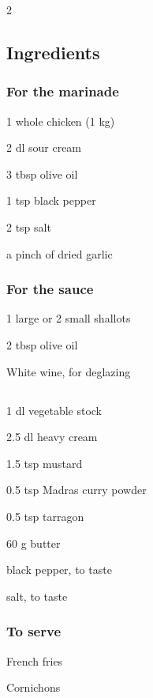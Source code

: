 \newpage
{}

\begin{multicols}{2}
	\subsection*{Ingredients}
	
	\subsubsection*{For the marinade}
	\begin{ingredients}
		\item 1 whole chicken (1 kg)
		\item 2 dl sour cream
		\item 3 tbsp olive oil
		\item 1 tsp black pepper
		\item 2 tsp salt
		\item a pinch of dried garlic
	\end{ingredients}
	
	\subsubsection*{For the sauce}
	\begin{ingredients}
		\item 1 large or 2 small shallots
		\item 2 tbsp olive oil
		\item White wine, for deglazing
		\columnbreak
		\subsection*{ }
		\item 1 dl vegetable stock
		\item 2.5 dl heavy cream
		\item 1.5 tsp mustard
		\item 0.5 tsp Madras curry powder
		\item 0.5 tsp tarragon
		\item 60 g butter
		\item black pepper, to taste
		\item salt, to taste
	\end{ingredients}
	
	\subsubsection*{To serve}
	\begin{ingredients}
		\item French fries
		\item Cornichons
	\end{ingredients}
	
\end{multicols}

